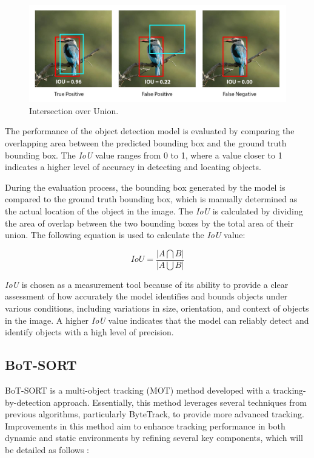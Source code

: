 \begin{figure}[H]
  \centering
  \includegraphics[scale=0.15]{gambar/IoU bbox.jpg}
  \caption{Intersection over Union.}
  \label{fig:IoU_bbox}
\end{figure}

The performance of the object detection model is evaluated by comparing the overlapping area between the predicted bounding box and the ground truth bounding box. The \emph{IoU} value ranges from 0 to 1, where a value closer to 1 indicates a higher level of accuracy in detecting and locating objects.

During the evaluation process, the bounding box generated by the model is compared to the ground truth bounding box, which is manually determined as the actual location of the object in the image. The \emph{IoU} is calculated by dividing the area of overlap between the two bounding boxes by the total area of their union. The following equation is used to calculate the \emph{IoU} value:

\begin{equation}
  IoU = \frac{\left |A \bigcap B \right |}{\left | A \bigcup B \right |}
\end{equation}

\emph{IoU} is chosen as a measurement tool because of its ability to provide a clear assessment of how accurately the model identifies and bounds objects under various conditions, including variations in size, orientation, and context of objects in the image. A higher \emph{IoU} value indicates that the model can reliably detect and identify objects with a high level of precision.

\subsection{BoT-SORT}

BoT-SORT is a multi-object tracking (MOT) method developed with a tracking-by-detection approach. Essentially, this method leverages several techniques from previous algorithms, particularly ByteTrack, to provide more advanced tracking. Improvements in this method aim to enhance tracking performance in both dynamic and static environments by refining several key components, which will be detailed as follows \cite{aharon2022botsortrobustassociationsmultipedestrian}:


